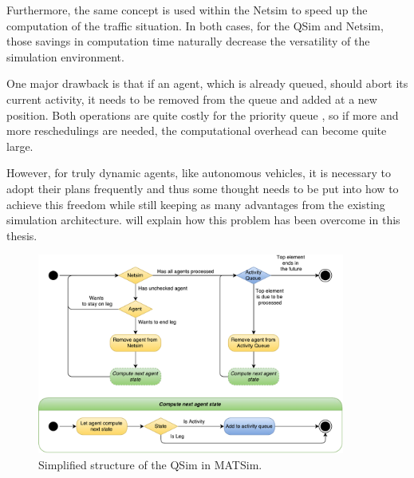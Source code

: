 Furthermore, the same concept is used within the Netsim to speed up the computation
of the traffic situation. In both cases, for the QSim and Netsim, those savings in
computation time naturally decrease the versatility of the simulation environment.

One major drawback is that if an agent, which is already queued, should abort its
current activity, it needs to be removed from the queue and added at a new position.
Both operations are quite costly for the priority queue \citep{JavaPQ}, so
if more and more reschedulings are needed, the computational overhead can become
quite large.

However, for truly dynamic agents, like autonomous vehicles, it is necessary to
adopt their plans frequently and thus some thought needs to be put into how to
achieve this freedom while still keeping as many advantages from the existing
simulation architecture.  will explain how this problem has
been overcome in this thesis.

\begin{figure}
    \centering
    \includegraphics[width=0.9\textwidth]{figures/qsim.pdf}
    \caption{Simplified structure of the QSim in MATSim.}
    \label{fig:qsim}
\end{figure}
